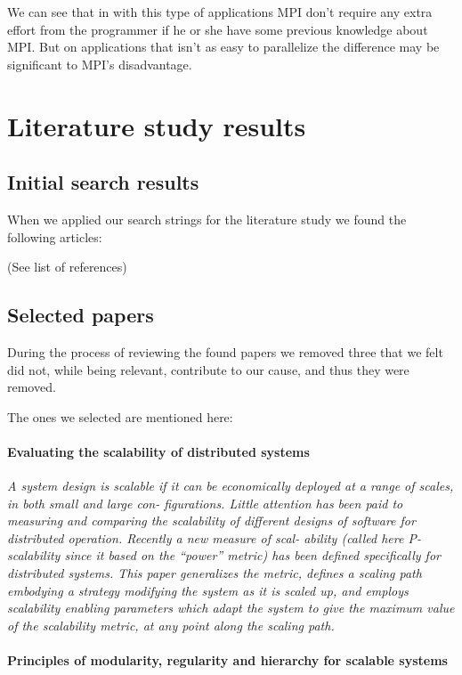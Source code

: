 \documentclass{article}
\begin{document}
{We can see that in with this type of applications MPI don't require any extra
effort from the programmer if he or she have some previous knowledge about MPI.
But on applications that isn't as easy to parallelize the difference may be 
significant to MPI's disadvantage.

 
\section{Literature study results}

\subsection{Initial search results}
When we applied our search strings for the literature study we found the
following articles:

(See list of references)

\subsection{Selected papers}
During the process of reviewing the found papers we removed three that we felt
did not, while being relevant, contribute to our cause, and thus they were
removed. 

The ones we selected are mentioned here:

\paragraph{Evaluating the scalability of distributed systems}
\cite{jogalekar2000evaluating}

\emph{A system design is scalable if it can be economically deployed at a range
of scales, in both small and large con- figurations. Little attention has been
paid to measuring and comparing the scalability of different designs of
software for distributed operation. Recently a new measure of scal- ability
(called here P-scalability since it based on the “power” metric) has been
defined specifically for distributed systems. This paper generalizes the
metric, defines a scaling path embodying a strategy modifying the system as it
is scaled up, and employs scalability enabling parameters which adapt the
system to give the maximum value of the scalability metric, at any point along
the scaling path.}

\paragraph{Principles of modularity, regularity and hierarchy for scalable
systems} \cite{lipson2007principles}

}
\end{document}
